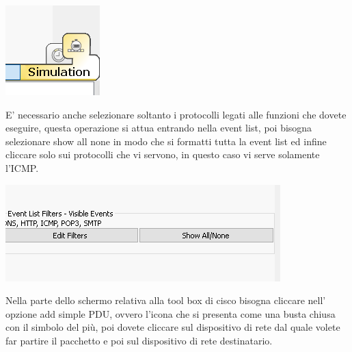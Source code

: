 \begin{center}
    \includegraphics[width=\linewidth]{images/04.debugging-rete/04.png}
\end{center}

E’ necessario anche selezionare soltanto i protocolli legati alle funzioni che dovete eseguire, questa operazione si attua entrando nella event list, poi bisogna selezionare show all none in modo che si formatti tutta la event list ed infine cliccare solo sui protocolli che vi servono, in questo caso vi serve solamente l'ICMP.

\begin{center}
    \includegraphics[width=\linewidth]{images/04.debugging-rete/05.png}
\end{center}

Nella parte dello schermo relativa alla tool box di cisco bisogna cliccare nell’ opzione add simple PDU, ovvero l'icona che si presenta come una busta chiusa con il simbolo del più, poi dovete cliccare sul dispositivo di rete dal quale volete far partire il pacchetto e poi sul dispositivo di rete destinatario.

